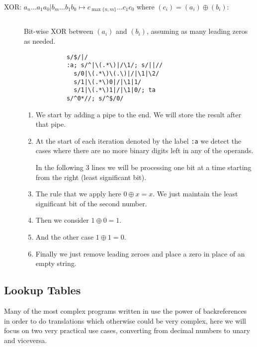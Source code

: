 \begin{description}
	\item[XOR: $a_n\ldots a_1 a_0\texttt{|}b_m\ldots b_1 b_0 \mapsto
		c_{\max\{n, m\}}\ldots c_1 c_0$ where $(c_i)=(a_i)\oplus(b_i)$:]$\,$

		Bit-wise XOR between $(a_i)$ and $(b_i)$, assuming as many leading zeros
		as needed.

		\begin{Verbatim}
			s/$/|/
			:a; s/^|\(.*\)|/\1/; s/||//
			  s/0|\(.*\)\(.\)|/|\1|\2/
			  s/1|\(.*\)0|/|\1|1/
			  s/1|\(.*\)1|/|\1|0/; ta
			s/^0*//; s/^$/0/
		\end{Verbatim}

		\begin{enumerate}
			\item We start by adding a pipe to the end.
				We will store the result after that pipe.
			\item At the start of each iteration denoted by the label \verb|:a| we
				detect the cases where there are no more binary digits left in any
				of the operands.

				In the following 3 lines we will be processing
				one bit at a time starting from the right (least significant bit).
			\item The rule that we apply here $0\oplus x = x$.  We just maintain the
				least significant bit of the second number.
			\item Then we consider $1\oplus 0=1$.
			\item And the other case $1\oplus 1=0$.
			\item Finally we just remove leading zeroes and place a zero in place of
				an empty string.
		\end{enumerate}
\end{description}



\subsection{Lookup Tables}

Many of the most complex programs written in \sed* use the power of
backreferences in order to do translations which otherwise could be very
complex, here we will focus on two very practical use cases, converting from
decimal numbers to unary and viceversa.

